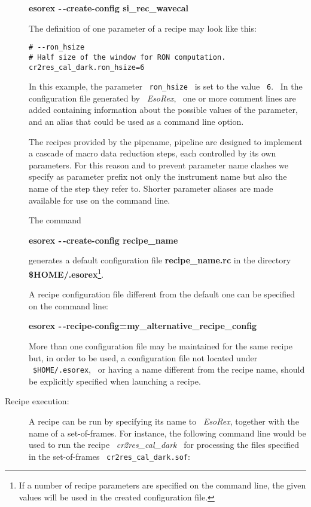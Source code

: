 \begin{description}
{\bf esorex -\,-create-config si\_rec\_wavecal}

The definition of one parameter of a recipe may look like this:
\begin{verbatim}
# --ron_hsize
# Half size of the window for RON computation.
cr2res_cal_dark.ron_hsize=6
\end{verbatim}


In this example, the parameter \ {\tt ron\_hsize} 
\ is set to the value \ {\tt 6}. \ In the configuration file
generated by \ {\it EsoRex}, \ one or more comment lines are added
containing information about the possible values of the parameter, and
an alias that could be used as a command line option.  

The recipes provided by the pipename, pipeline are designed to implement 
a cascade of macro data reduction steps, each controlled by 
its own parameters.
For this reason and to prevent parameter name clashes we specify as 
parameter prefix not only the instrument name but also the name of the 
step they refer to. Shorter parameter aliases are made available for 
use on the command line.

The command

{\bf esorex -\,-create-config recipe\_name}

generates a default configuration file {\bf recipe\_name.rc} in the directory 
{\bf \${HOME}/.esorex}\footnote{If a number of recipe parameters are 
specified on the command line, the given values will be used in the
created configuration file.}.

A recipe configuration file different from the default one can be 
specified on the command line:

{\bf esorex -\,-recipe-config=my\_alternative\_recipe\_config}



More than one configuration file may be maintained for the same recipe
but, in order to be used, a configuration file not located under 
\ {\tt \$HOME/.esorex}, \ or having a name different from the recipe 
name, should be explicitly specified when launching a recipe.


\item [Recipe execution:]


A recipe can be run by specifying its name to 
\ {\it EsoRex}, together with the name of a set-of-frames.
For instance, the
following command line would be used to run the recipe \ {\it cr2res\_cal\_dark}
\ for processing the files specified in the set-of-frames 
\ {\tt cr2res\_cal\_dark.sof}:


\end{description}
